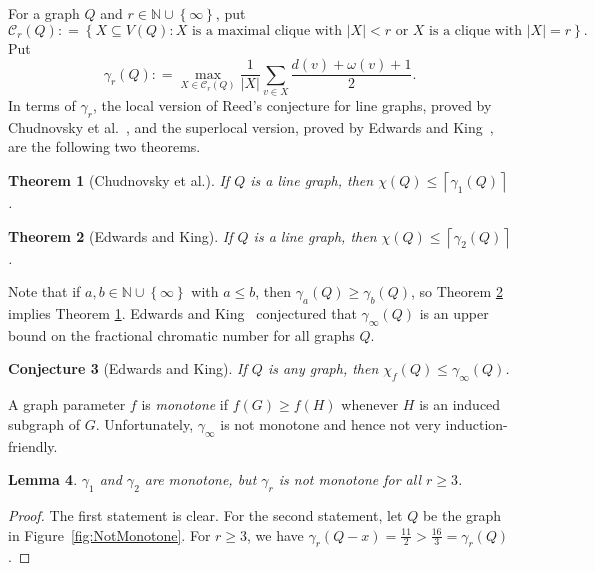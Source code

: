 \documentclass[12pt]{article}
\theoremstyle{plain}
\newtheorem{thm}{Theorem}
\newtheorem{lem}[thm]{Lemma}
\newtheorem{conj}[thm]{Conjecture}
\theoremstyle{definition}
\theoremstyle{remark}
\newcommand{\fancy}[1]{\mathcal{#1}}
\newcommand{\C}{\fancy{C}}
\newcommand{\IN}{\mathbb{N}}
\newcommand{\set}[1]{\left\{ #1 \right\}}
\newcommand{\setbs}[2]{\left\{ #1 : #2 \right\}}
\newcommand{\card}[1]{\left|#1\right|}
\newcommand{\ceil}[1]{\left\lceil#1\right\rceil}
\newcommand{\DefinedAs}{\mathrel{\mathop:}=}
\begin{document}
For a graph $Q$ and $r \in \IN \cup \set{\infty}$, put
\[\C_r(Q) \DefinedAs \setbs{X \subseteq V(Q)}{X \text{ is a maximal clique with } \card{X} < r \text { or } X \text { is a clique with } \card{X} = r}.\]  
Put
\[\gamma_r(Q) \DefinedAs \max_{X \in \C_r(Q)} \frac{1}{\card{X}}\sum_{v \in X} \frac{d(v) + \omega(v) + 1}{2}.\]
In terms of $\gamma_r$, the local version of Reed's conjecture for line graphs,
proved by Chudnovsky et al.~\cite{CKPS}, and the superlocal version, proved by
Edwards and King~\cite{EK-superlocal}, are the following two theorems.

\begin{thm}[Chudnovsky et al.]
If $Q$ is a line graph, then $\chi(Q) \le \ceil{\gamma_1(Q)}$.
\label{LocalReed}
\end{thm}

\begin{thm}[Edwards and King]
If $Q$ is a line graph, then $\chi(Q) \le \ceil{\gamma_2(Q)}$.
\label{KingEdwardsSuperLocal}
\end{thm}

Note that if $a, b \in \IN \cup \set{\infty}$ with $a \le b$, then $\gamma_a(Q) \ge \gamma_b(Q)$, so Theorem \ref{KingEdwardsSuperLocal} implies Theorem \ref{LocalReed}.  
Edwards and King~\cite{EK-superlocal} conjectured that $\gamma_\infty(Q)$ is an
upper bound on the fractional chromatic number for all graphs $Q$.

\begin{conj}[Edwards and King]
If $Q$ is any graph, then $\chi_f(Q) \le \gamma_\infty(Q)$.
\label{EKconj}
\end{conj}

A graph parameter $f$ is \emph{monotone} if $f(G)\ge f(H)$ whenever $H$ is an
induced subgraph of $G$.
Unfortunately, $\gamma_\infty$ is not monotone and hence not very induction-friendly.
\begin{lem}
$\gamma_1$ and $\gamma_2$ are monotone, but $\gamma_r$ is not monotone for all
$r \ge 3$.
\end{lem}
\begin{proof}
The first statement is clear.
For the second statement, let $Q$ be the graph in Figure~\ref{fig:NotMonotone}.
 For $r \ge 3$, we have $\gamma_r(Q -x) = \frac{11}{2} > \frac{16}{3} = \gamma_r(Q)$.
\end{proof}
\end{document}
